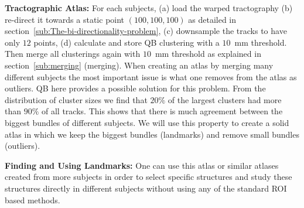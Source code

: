 \documentclass[preprint,authoryear,a4paper,10pt,onecolumn]{elsarticle}
\begin{document}
\textbf{Tractographic Atlas:} For each subjects, (a) load the warped
tractography (b) re-direct it towards a static point $(100,100,100)$ as
detailed in section~\ref{sub:The-bi-directionality-problem}, (c)
downsample the tracks to have only $12$ points, (d) calculate and store
QB clustering with a $10$~mm threshold. Then merge all clusterings again
with $10$~mm threshold as explained in section~\ref{sub:merging}
(merging). When creating an atlas by merging many different subjects the
most important issue is what one removes from the atlas as outliers. QB
here provides a possible solution for this problem. From the
distribution of cluster sizes we find that $20\%$ of the largest
clusters had more than $90\%$ of all tracks. This shows that there is
much agreement between the biggest bundles of different subjects.  We
will use this property to create a solid atlas in which we keep the
biggest bundles (landmarks) and remove small bundles (outliers).

\textbf{Finding and Using Landmarks:} One can use this atlas or similar
atlases created from more subjects in order to select specific
structures and study these structures directly in different subjects
without using any of the standard ROI based methods.
\end{document}
